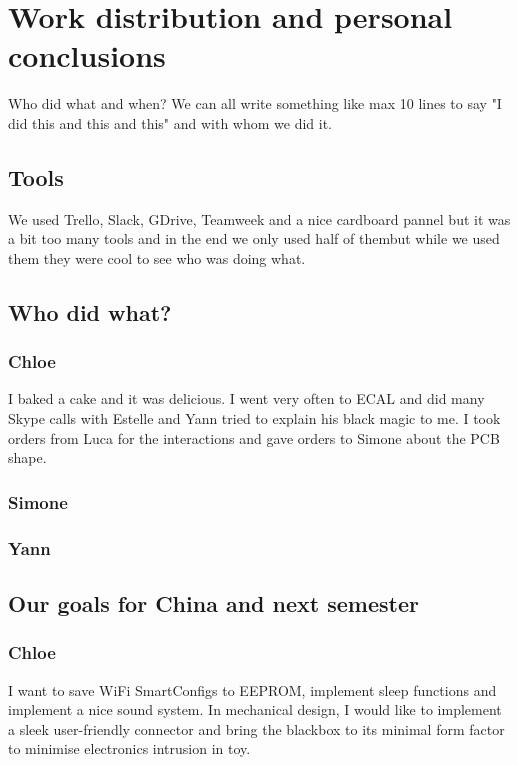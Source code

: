 \newpage
\section{Work distribution and personal conclusions}
\label{appendix:work_distribution}

Who did what and when? We can all write something like max 10 lines to say "I did this and this and this" and with whom we did it.

\subsection{Tools}
We used Trello, Slack, GDrive, Teamweek and a nice cardboard pannel but it was a bit too many tools and in the end we only used half of thembut while we used them they were cool to see who was doing what.

\subsection{Who did what?}
    \subsubsection{Chloe}
I baked a cake and it was delicious. I went very often to ECAL and did many Skype calls with Estelle and Yann tried to explain his black magic to me. I took orders from Luca for the interactions and gave orders to Simone about the PCB shape.
    \subsubsection{Simone}
    \subsubsection{Yann}
    
\subsection{Our goals for China and next semester}
    \subsubsection{Chloe}
I want to save WiFi SmartConfigs to EEPROM, implement sleep functions and implement a nice sound system. In mechanical design, I would like to implement a sleek user-friendly connector and bring the blackbox to its minimal form factor to minimise electronics intrusion in toy.
